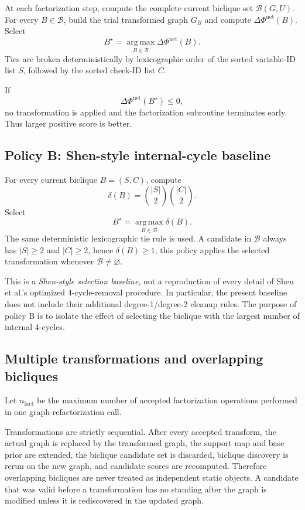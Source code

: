 \documentclass[11pt,a4paper]{article}
\newcommand{\Bcal}{\mathcal B}
\newcommand{\argmax}{\operatorname*{arg\,max}}
\begin{document}
At each factorization step, compute the complete current biclique set
$\Bcal(G,U)$. For every $B\in\Bcal$, build the trial transformed graph $G_B$
and compute $\Delta\Phi^{\mathrm{net}}(B)$. Select
\[
\boxed{
B^\star
=
\argmax_{B\in\Bcal}
\Delta\Phi^{\mathrm{net}}(B).
}
\]
Ties are broken deterministically by lexicographic order of the sorted
variable-ID list $S$, followed by the sorted check-ID list $C$.

If
\[
\boxed{
\Delta\Phi^{\mathrm{net}}(B^\star)\le0,
}
\]
no transformation is applied and the factorization subroutine terminates
early. Thus larger positive score is better.

\subsection{Policy B: Shen-style internal-cycle baseline}

For every current biclique $B=(S,C)$, compute
\[
\boxed{
\delta(B)
=
\binom{|S|}{2}
\binom{|C|}{2}.
}
\]
Select
\[
\boxed{
B^\star
=
\argmax_{B\in\Bcal}\delta(B).
}
\]
The same deterministic lexicographic tie rule is used. A candidate in
$\Bcal$ always has $|S|\ge2$ and $|C|\ge2$, hence $\delta(B)\ge1$; this policy
applies the selected transformation whenever $\Bcal\ne\varnothing$.

This is a \emph{Shen-style selection baseline}, not a reproduction of every
detail of Shen et al.'s optimized 4-cycle-removal procedure. In particular,
the present baseline does not include their additional degree-1/degree-2
cleanup rules. The purpose of policy B is to isolate the effect of selecting
the biclique with the largest number of internal 4-cycles.

\subsection{Multiple transformations and overlapping bicliques}

Let $n_{\mathrm{fact}}$ be the maximum number of accepted factorization
operations performed in one graph-refactorization call.

Transformations are strictly sequential. After every accepted transform, the
actual graph is replaced by the transformed graph, the support map and base
prior are extended, the biclique candidate set is discarded, biclique
discovery is rerun on the new graph, and candidate scores are recomputed.
Therefore overlapping bicliques are never treated as independent static
objects. A candidate that was valid before a transformation has no standing
after the graph is modified unless it is rediscovered in the updated graph.
\end{document}
